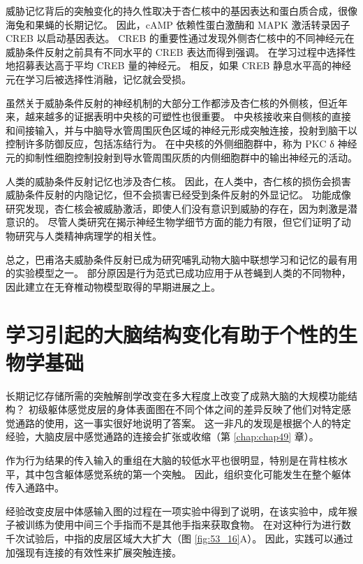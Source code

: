 威胁记忆背后的突触变化的持久性取决于杏仁核中的基因表达和蛋白质合成，很像海兔和果蝇的长期记忆。 因此，cAMP 依赖性蛋白激酶和 MAPK 激活转录因子 CREB 以启动基因表达。 CREB 的重要性通过发现外侧杏仁核中的不同神经元在威胁条件反射之前具有不同水平的 CREB 表达而得到强调。 在学习过程中选择性地招募表达高于平均 CREB 量的神经元。 相反，如果 CREB 静息水平高的神经元在学习后被选择性消融，记忆就会受损。

虽然关于威胁条件反射的神经机制的大部分工作都涉及杏仁核的外侧核，但近年来，越来越多的证据表明中央核的可塑性也很重要。 中央核接收来自侧核的直接和间接输入，并与中脑导水管周围灰色区域的神经元形成突触连接，投射到脑干以控制许多防御反应，包括冻结行为。 在中央核的外侧细胞群中，称为 PKC δ 神经元的抑制性细胞控制投射到导水管周围灰质的内侧细胞群中的输出神经元的活动。

人类的威胁条件反射记忆也涉及杏仁核。 因此，在人类中，杏仁核的损伤会损害威胁条件反射的内隐记忆，但不会损害已经受到条件反射的外显记忆。 功能成像研究发现，杏仁核会被威胁激活，即使人们没有意识到威胁的存在，因为刺激是潜意识的。 尽管人类研究在揭示神经生物学细节方面的能力有限，但它们证明了动物研究与人类精神病理学的相关性。

总之，巴甫洛夫威胁条件反射已成为研究哺乳动物大脑中联想学习和记忆的最有用的实验模型之一。 部分原因是行为范式已成功应用于从苍蝇到人类的不同物种，因此建立在无脊椎动物模型取得的早期进展之上。


\section{学习引起的大脑结构变化有助于个性的生物学基础}
长期记忆存储所需的突触解剖学改变在多大程度上改变了成熟大脑的大规模功能结构？ 初级躯体感觉皮层的身体表面图在不同个体之间的差异反映了他们对特定感觉通路的使用，这一事实很好地说明了答案。 这一非凡的发现是根据个人的特定经验，大脑皮层中感觉通路的连接会扩张或收缩（第 \ref{chap:chap49} 章）。

作为行为结果的传入输入的重组在大脑的较低水平也很明显，特别是在背柱核水平，其中包含躯体感觉系统的第一个突触。 因此，组织变化可能发生在整个躯体传入通路中。

经验改变皮层中体感输入图的过程在一项实验中得到了说明，在该实验中，成年猴子被训练为使用中间三个手指而不是其他手指来获取食物。 在对这种行为进行数千次试验后，中指的皮层区域大大扩大（图 \ref{fig:53_16}A）。 因此，实践可以通过加强现有连接的有效性来扩展突触连接。

